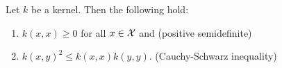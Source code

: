 Let \(k\) be a kernel.
Then the following hold:
\begin{enumerate}
    \item \label{itm:properties-of-kernels-psd}
    \(k(x,x) \geq 0\) for all \(x \in \mathcal{X}\) and
    \hfill (positive semidefinite)
    \item \label{itm:properties-of-kernels-csi}
    \(k(x,y)^2 \leq k(x,x) k(y,y)\).
    \hfill (Cauchy-Schwarz inequality)
\end{enumerate}